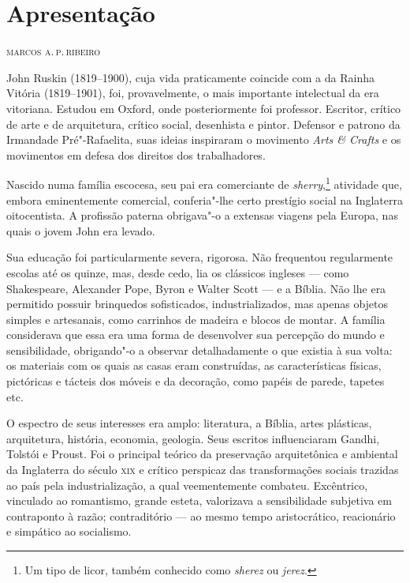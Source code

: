 \newcommand{\subtitulo}[1]{\NoCaseChange{\textnormal{\break\Large\itshape#1}}}
\chapter*{Apresentação\smallskip\subtitulo{Um testamento literário escrito\\ao longo de 27 anos}}

\begin{flushright}
\textsc{marcos a.\,p.\,ribeiro}
\end{flushright}\medskip

\noindent{}John Ruskin (1819--1900), cuja vida praticamente coincide com a da Rainha
Vitória (1819--1901), foi, provavelmente, o mais importante intelectual da
era vitoriana. Estudou em Oxford, onde posteriormente foi professor.
Escritor, crítico de arte e de arquitetura, crítico social, desenhista e
pintor. Defensor e patrono da Irmandade Pré"-Rafaelita, suas ideias
inspiraram o movimento \textit{Arts \& Crafts} e os movimentos em defesa
dos direitos dos trabalhadores.

Nascido numa família escocesa, seu pai era comerciante de \textit{sherry},\footnote{Um tipo de licor, também conhecido como \textit{sherez} ou \textit{jerez}.} atividade que, embora eminentemente comercial, conferia"-lhe
certo prestígio social na Inglaterra oitocentista. A profissão paterna
obrigava"-o a extensas viagens pela Europa, nas quais o jovem John era
levado. 

Sua educação foi particularmente severa, rigorosa. Não
frequentou regularmente escolas até os quinze, mas, desde cedo, lia os
clássicos ingleses --- como Shakespeare, Alexander Pope, Byron e Walter Scott --- e
a Bíblia. Não lhe era permitido possuir brinquedos sofisticados,
industrializados, mas apenas objetos simples e artesanais, como
carrinhos de madeira e blocos de montar. A família considerava que essa
era uma forma de desenvolver sua percepção do mundo e sensibilidade,
obrigando"-o a observar detalhadamente o que existia à sua volta: os
materiais com os quais as casas eram construídas, as características
físicas, pictóricas e tácteis dos móveis e da decoração, como papéis de
parede, tapetes etc.

O espectro de seus interesses era amplo: literatura, a Bíblia, artes
plásticas, arquitetura, história, economia, geologia. Seus escritos
influenciaram Gandhi, Tolstói e Proust. Foi o principal teórico da
preservação arquitetônica e ambiental da Inglaterra do século \textsc{xix} e
crítico perspicaz das transformações sociais trazidas ao país pela
industrialização, a qual veementemente combateu. Excêntrico, vinculado
ao romantismo, grande esteta, valorizava a sensibilidade subjetiva em
contraponto à razão; contraditório --- ao mesmo tempo aristocrático,
reacionário e simpático ao socialismo.

